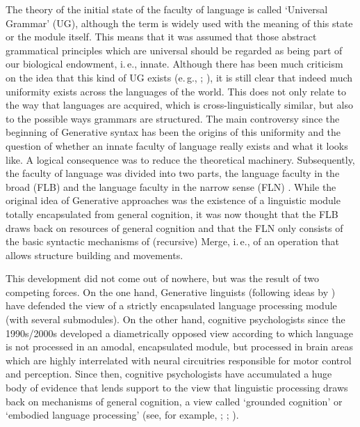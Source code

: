 \noindent The theory of the initial state of the faculty of language is called `Universal Grammar' (UG), although the term is widely used with the meaning of this state or the module itself. This means that it was assumed that those abstract grammatical principles which are universal should be regarded as being part of our biological endowment, i.\,e., innate. Although there has been much criticism on the idea that this kind of UG exists (e.\,g., \citealt{evans2009myth}; \citealt{levinson2010time}), it is still clear that indeed much uniformity exists across the languages of the world. This does not only relate to the way that languages are acquired, which is cross-linguistically similar, but also to the possible ways grammars are structured. The main controversy since the beginning of Generative syntax has been the origins of this uniformity and the question of whether an innate faculty of language really exists and what it looks like. 
A logical consequence was to reduce the theoretical machinery. Subsequently, the faculty of language was divided into two parts, the language faculty in the broad (FLB) and the language faculty in the narrow sense (FLN) \citep{hauser2002faculty,fitch2005evolution}. While the original idea of Generative approaches was the existence of a linguistic module totally encapsulated from general cognition, it was now thought that the FLB draws back on resources of general cognition and that the FLN only consists of the basic syntactic mechanisms of (recursive) Merge, i.\,e., of an operation that allows structure building and movements. 

This development did not come out of nowhere, but was the result of two competing forces. On the one hand, Generative linguists (following ideas by \citealt{fodor1975language, jerry1983modularity}) have defended the view of a strictly encapsulated language processing module (with several submodules). On the other hand, cognitive psychologists since the 1990s/2000s developed a diametrically opposed view according to which language is not processed in an amodal, encapsulated  module, but processed in brain areas which are highly interrelated with neural circuitries responsible for motor control and perception. Since then, cognitive psychologists have accumulated a huge body of evidence that lends support to the view that linguistic processing draws back on mechanisms of general cognition, a view called `grounded cognition' or `embodied language processing' (see, for example, \citealt{glenberg2002grounding}; \citealt{pecher2005grounding}; \citealt{barsalou2008grounded}).


